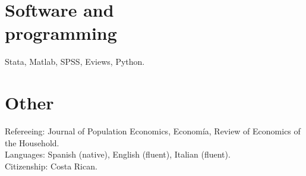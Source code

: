 \documentclass[margin]{res} %
\begin{document}
\begin{resume}
%

\section{Software and \\ programming}
Stata, Matlab, SPSS, Eviews, Python. \\

\section{Other}
Refereeing: Journal of Population Economics, Econom\'ia, Review of Economics of the Household. \\
Languages: Spanish (native), English (fluent), Italian (fluent). \\
Citizenship: Costa Rican.





\end{resume}
\end{document}
